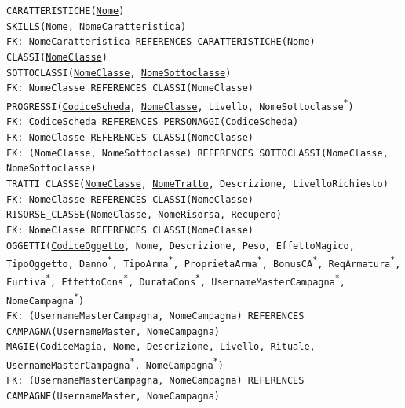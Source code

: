 \documentclass[a4paper,12pt]{report}
\begin{document}
\noindent \texttt{CARATTERISTICHE(\underline{Nome})} \\

\noindent \texttt{SKILLS(\underline{Nome}, NomeCaratteristica)} \\
\texttt{FK: NomeCaratteristica REFERENCES CARATTERISTICHE(Nome)} \\

\noindent \texttt{CLASSI(\underline{NomeClasse})} \\

\noindent \texttt{SOTTOCLASSI(\underline{NomeClasse}, \underline{NomeSottoclasse})} \\
\texttt{FK: NomeClasse REFERENCES CLASSI(NomeClasse)} \\

\noindent \texttt{PROGRESSI(\underline{CodiceScheda}, \underline{NomeClasse}, Livello, NomeSottoclasse\textsuperscript{*})} \\
\texttt{FK: CodiceScheda REFERENCES PERSONAGGI(CodiceScheda)} \\
\texttt{FK: NomeClasse REFERENCES CLASSI(NomeClasse)} \\
\texttt{FK: (NomeClasse, NomeSottoclasse) REFERENCES SOTTOCLASSI(NomeClasse, NomeSottoclasse)} \\

\noindent \texttt{TRATTI\_CLASSE(\underline{NomeClasse}, \underline{NomeTratto}, Descrizione, LivelloRichiesto)} \\
\texttt{FK: NomeClasse REFERENCES CLASSI(NomeClasse)} \\

\noindent \texttt{RISORSE\_CLASSE(\underline{NomeClasse}, \underline{NomeRisorsa}, Recupero)} \\
\texttt{FK: NomeClasse REFERENCES CLASSI(NomeClasse)} \\

\noindent \texttt{OGGETTI(\underline{CodiceOggetto}, Nome, Descrizione, Peso, EffettoMagico, TipoOggetto, Danno\textsuperscript{*}, TipoArma\textsuperscript{*}, ProprietaArma\textsuperscript{*}, BonusCA\textsuperscript{*}, ReqArmatura\textsuperscript{*}, Furtiva\textsuperscript{*}, EffettoCons\textsuperscript{*}, DurataCons\textsuperscript{*}, UsernameMasterCampagna\textsuperscript{*}, NomeCampagna\textsuperscript{*})} \\
\texttt{FK: (UsernameMasterCampagna, NomeCampagna) REFERENCES CAMPAGNA(UsernameMaster, NomeCampagna)} \\

\noindent \texttt{MAGIE(\underline{CodiceMagia}, Nome, Descrizione, Livello, Rituale, UsernameMasterCampagna\textsuperscript{*}, NomeCampagna\textsuperscript{*})} \\
\texttt{FK: (UsernameMasterCampagna, NomeCampagna) REFERENCES CAMPAGNE(UsernameMaster, NomeCampagna)} \\
\end{document}
